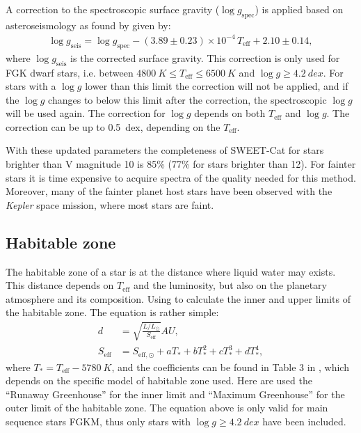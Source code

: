 A correction to the spectroscopic surface gravity ($\log g_\mathrm{spec}$) is applied based on
asteroseismology as found by \citet{Mortier2014} given by:
\begin{align}
  \log g_\mathrm{seis} = \log g_\mathrm{spec} - (3.89\pm0.23)\times 10^{-4}\,T_\mathrm{eff}+2.10\pm0.14,
\end{align}
where $\log g_\mathrm{seis}$ is the corrected surface gravity. This correction is only used for FGK
dwarf stars, i.e. between $\SI{4800}{K}\leq T_\mathrm{eff}\leq\SI{6500}{K}$ and $\log
g\geq\SI{4.2}{dex}$. For stars with a $\log g$ lower than this limit the correction will not be
applied, and if the $\log g$ changes to below this limit after the correction, the spectroscopic
$\log g$ will be used again. The correction for $\log g$ depends on both $T_\mathrm{eff}$ and $\log
g$. The correction can be up to \SI{0.5}{dex}, depending on the $T_\mathrm{eff}$.

With these updated parameters the completeness of SWEET-Cat for stars brighter than V magnitude 10
is 85\% (77\% for stars brighter than 12). For fainter stars it is time expensive to acquire spectra
of the quality needed for this method. Moreover, many of the fainter planet host stars have been
observed with the \emph{Kepler} space mission, where most stars are faint.


\subsection{Habitable zone}
\label{sec:HZ}

The habitable zone of a star is at the distance where liquid water may exists. This distance depends
on $T_\mathrm{eff}$ and the luminosity, but also on the planetary atmosphere and its composition.
Using \citet[equation 3 described in][]{Kopparapu2013} to calculate the inner and upper limits of
the habitable zone. The equation is rather simple:
\begin{align}
 d &= \sqrt{\frac{L/L_\odot}{S_\mathrm{eff}}} \si{AU}, \\
 S_\mathrm{eff} &= S_{\mathrm{eff},\odot} + aT_\ast + bT_\ast^2 + cT_\ast^3 + dT_\ast^4,
\end{align}
where $T_\ast=T_\mathrm{eff}-\SI{5780}{K}$, and the coefficients can be found in Table 3 in
\citet{Kopparapu2013}, which depends on the specific model of habitable zone used. Here are used the
``Runaway Greenhouse'' for the inner limit and ``Maximum Greenhouse'' for the outer limit of the
habitable zone. The equation above is only valid for main sequence stars FGKM, thus only stars with
$\log g\geq\SI{4.2}{dex}$ have been included.


